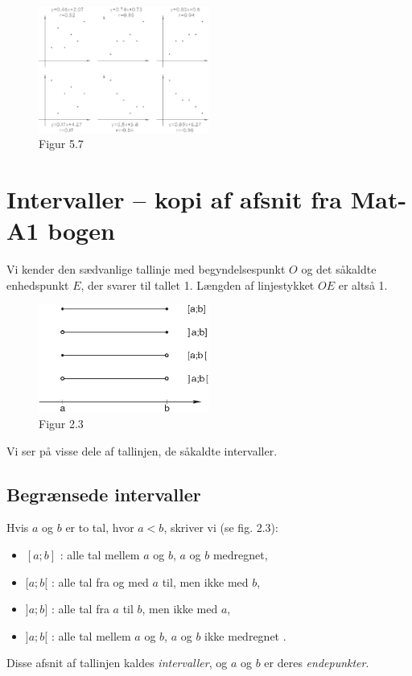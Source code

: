 \documentclass[12pt,oneside,a4paper]{article}
\begin{document}
\begin{figure}[ht]
    \centering
    \includegraphics[width=0.5\textwidth]{fig57}
    \caption{Figur 5.7}
    \label{fig57}
\end{figure}


\section{Intervaller -- kopi af afsnit fra Mat-A1 bogen}

Vi kender den sædvanlige tallinje med begyndelsespunkt $O$ og det såkaldte
enhedspunkt $E$, der svarer til tallet 1. Længden af linjestykket $OE$ er altså 1.

\begin{figure}[ht]
    \centering
    \includegraphics[width=0.5\textwidth]{fig23}
    \caption{Figur 2.3}
    \label{fig23}
\end{figure}

Vi ser på visse dele af tallinjen, de såkaldte intervaller.

\subsection{Begrænsede intervaller}
Hvis $a$ og $b$ er to tal, hvor $a < b$, skriver vi (se fig. 2.3):
\begin{itemize}
    \item $[a;b]$ : alle tal mellem $a$ og $b$, $a$ og $b$ medregnet,
    \item $[a;b[$ : alle tal fra og med $a$ til, men ikke med $b$,
    \item $]a;b]$ : alle tal fra $a$ til $b$, men ikke med $a$,
    \item $]a;b[$ : alle tal mellem $a$ og $b$, $a$ og $b$ ikke medregnet .
\end{itemize}
Disse afsnit af tallinjen kaldes {\em intervaller}, og $a$ og $b$ er deres {\em endepunkter}.
\end{document}
